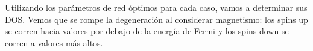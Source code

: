   Utilizando los parámetros de red óptimos para cada caso, vamos a determinar sus DOS. Vemos que se rompe la degeneración al considerar magnetismo: los spins up se corren hacia valores por debajo de la energía de Fermi y los spins down se corren a valores más altos.

  \begin{figure}[H]
      \centering
  \end{figure}

